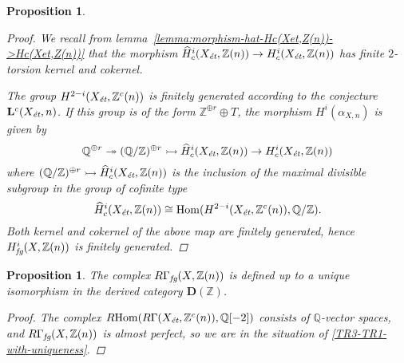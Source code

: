 \documentclass[leqno,12pt]{article}
\theoremstyle{plain}
\newtheorem{proposition}[theorem]{\indent\sc Proposition}
\theoremstyle{definition}
\DeclareMathOperator{\Hom}{Hom}
\newcommand{\ZZ}{\mathbb{Z}}
\newcommand{\QQ}{\mathbb{Q}}
\newcommand{\et}{\text{\it \'{e}t}}
\newcommand{\fg}{\text{\it fg}}
\newcommand{\RHom}{R\!\Hom}
\begin{document}
\begin{proposition}
\begin{proof}
    We recall from lemma~\ref{lemma:morphism-hat-Hc(Xet,Z(n))->Hc(Xet,Z(n))}
    that the morphism
    $\widehat{H}^i_c (X_\et, \ZZ (n)) \to H^i_c (X_\et, \ZZ (n))$ has finite
    $2$-torsion kernel and cokernel.

    The group $H^{2-i} (X_\et, \ZZ^c (n))$ is finitely generated
    according to the conjecture $\mathbf{L}^c (X_\et, n)$. If this
    group is of the form $\ZZ^{\oplus r}\oplus T$, the morphism
    $H^i (\alpha_{X,n})$ is given by
    \[ \QQ^{\oplus r} \twoheadrightarrow
      (\QQ/\ZZ)^{\oplus r} \rightarrowtail
      \widehat{H}^i_c (X_\et, \ZZ (n)) \to
      H^i_c (X_\et, \ZZ (n)) \]
    where
    $(\QQ/\ZZ)^{\oplus r} \rightarrowtail \widehat{H}^i_c (X_\et, \ZZ (n))$ is
    the inclusion of the maximal divisible subgroup in the group of cofinite
    type
    $$\widehat{H}^i_c (X_\et, \ZZ (n)) \cong \Hom (H^{2-i} (X_\et, \ZZ^c (n)), \QQ/\ZZ).$$
    Both kernel and cokernel of the above map are finitely generated, hence
    $H^i_\fg (X, \ZZ (n))$ is finitely generated.
  \end{proof}
\end{proposition}

\begin{proposition}
  \label{prop:RGamma-fg-uniquely-defined}
  The complex $R\Gamma_\fg (X, \ZZ (n))$ is defined up to a unique isomorphism
  in the derived category $\mathbf{D} (\ZZ)$.

  \begin{proof}
    The complex $\RHom (R\Gamma (X_\et, \ZZ^c (n)), \QQ [-2])$ consists of
    $\QQ$-vector spaces, and $R\Gamma_\fg (X, \ZZ (n))$ is almost perfect, so we
    are in the situation of \ref{TR3-TR1-with-uniqueness}.
  \end{proof}
\end{proposition}
\end{document}
